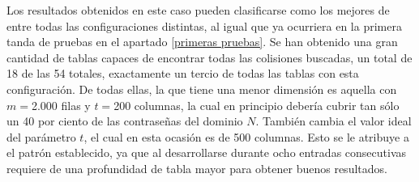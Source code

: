 \documentclass[12pt,spanish,listoffigures,listoftables,listofalgorithms]{tfgetsinf}
\begin{document}
\def\arraystretch{1.5}
\begin{table}[H]
	\centering
	\caption{Porcentajes de éxito para las tablas que emplean patrón extenso}
	\label{exPG}
\end{table}

Los resultados obtenidos en este caso pueden clasificarse como los mejores de entre todas las configuraciones distintas, al igual que ya ocurriera en la primera tanda de pruebas en el apartado \ref{primeras pruebas}. Se han obtenido una gran cantidad de tablas capaces de encontrar todas las colisiones buscadas, un total de 18 de las 54 totales, exactamente un tercio de todas las tablas con esta configuración. De todas ellas, la que tiene una menor dimensión es aquella con $m = $2.000 filas y $t = $200 columnas, la cual en principio debería cubrir tan sólo un 40 por ciento de las contraseñas del dominio $N$. También cambia el valor ideal del parámetro $t$, el cual en esta ocasión es de 500 columnas. Esto se le atribuye a el patrón establecido, ya que al desarrollarse durante ocho entradas consecutivas requiere de una profundidad de tabla mayor para obtener buenos resultados.
\end{document}
